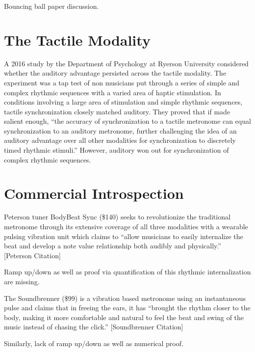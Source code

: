 Bouncing ball paper discussion.

\section{The Tactile Modality}
A 2016 study by the Department of Psychology at Ryerson University considered whether the auditory advantage persisted across the tactile modality. The experiment was a tap test of non musicians put through a series of simple and complex rhythmic sequences with a varied area of haptic stimulation. In conditions involving a large area of stimulation and simple rhythmic sequences, tactile synchronization closely matched auditory. They proved that if made salient enough, “the accuracy of synchronization to a tactile metronome can equal synchronization to an auditory metronome, further challenging the idea of an auditory advantage over all other modalities for synchronization to discretely timed rhythmic stimuli.” However, auditory won out for synchronization of complex rhythmic sequences. ~\cite{ammirante2016synchronizing}

\section{Commercial Introspection}
Peterson tuner BodyBeat Sync (\$140) seeks to revolutionize the traditional metronome through its extensive coverage of all three modalities with a wearable pulsing vibration unit which claims to “allow musicians to easily internalize the beat and develop a note value relationship both audibly and physically.” [Peterson Citation]

Ramp up/down as well as proof via quantification of this rhythmic internalization are missing.

The Soundbrenner (\$99) is a vibration based metronome using an instantaneous pulse and claims that in freeing the ears, it has “brought the rhythm closer to the body, making it more comfortable and natural to feel the beat and swing of the music instead of chasing the click.” [Soundbrenner Citation]

Similarly, lack of ramp up/down as well as numerical proof.
